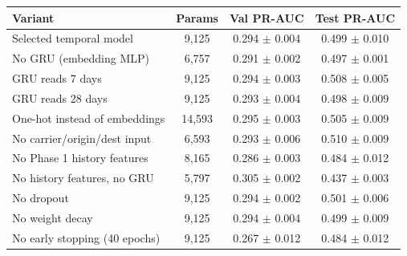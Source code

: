 \begin{tabular}{lccc}
\toprule
Variant & Params & Val PR-AUC & Test PR-AUC \\
\midrule
Selected temporal model & 9,125 & 0.294 $\pm$ 0.004 & 0.499 $\pm$ 0.010 \\
\midrule
No GRU (embedding MLP) & 6,757 & 0.291 $\pm$ 0.002 & 0.497 $\pm$ 0.001 \\
GRU reads 7 days & 9,125 & 0.294 $\pm$ 0.003 & 0.508 $\pm$ 0.005 \\
GRU reads 28 days & 9,125 & 0.293 $\pm$ 0.004 & 0.498 $\pm$ 0.009 \\
One-hot instead of embeddings & 14,593 & 0.295 $\pm$ 0.003 & 0.505 $\pm$ 0.009 \\
No carrier/origin/dest input & 6,593 & 0.293 $\pm$ 0.006 & 0.510 $\pm$ 0.009 \\
No Phase 1 history features & 8,165 & 0.286 $\pm$ 0.003 & 0.484 $\pm$ 0.012 \\
No history features, no GRU & 5,797 & 0.305 $\pm$ 0.002 & 0.437 $\pm$ 0.003 \\
No dropout & 9,125 & 0.294 $\pm$ 0.002 & 0.501 $\pm$ 0.006 \\
No weight decay & 9,125 & 0.294 $\pm$ 0.004 & 0.499 $\pm$ 0.009 \\
No early stopping (40 epochs) & 9,125 & 0.267 $\pm$ 0.012 & 0.484 $\pm$ 0.012 \\
\bottomrule
\end{tabular}
